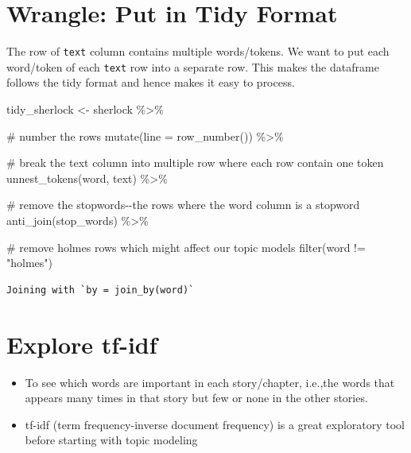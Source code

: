 \documentclass[
  letterpaper,
  DIV=11,
  numbers=noendperiod]{scrreprt}
\newenvironment{Shaded}{\begin{snugshade}}{\end{snugshade}}
\newcommand{\AttributeTok}[1]{\textcolor[rgb]{0.40,0.45,0.13}{#1}}
\newcommand{\CommentTok}[1]{\textcolor[rgb]{0.37,0.37,0.37}{#1}}
\newcommand{\FunctionTok}[1]{\textcolor[rgb]{0.28,0.35,0.67}{#1}}
\newcommand{\NormalTok}[1]{\textcolor[rgb]{0.00,0.23,0.31}{#1}}
\newcommand{\OtherTok}[1]{\textcolor[rgb]{0.00,0.23,0.31}{#1}}
\newcommand{\SpecialCharTok}[1]{\textcolor[rgb]{0.37,0.37,0.37}{#1}}
\newcommand{\StringTok}[1]{\textcolor[rgb]{0.13,0.47,0.30}{#1}}
\providecommand{\tightlist}{%
  \setlength{\itemsep}{0pt}\setlength{\parskip}{0pt}}\usepackage{longtable,booktabs,array}
\begin{document}
\chapter{Wrangle: Put in Tidy Format}\label{wrangle-put-in-tidy-format}

The row of \texttt{text} column contains multiple words/tokens. We want
to put each word/token of each \texttt{text} row into a separate row.
This makes the dataframe follows the tidy format and hence makes it easy
to process.

\begin{Shaded}
\begin{Highlighting}[]
\NormalTok{tidy\_sherlock }\OtherTok{\textless{}{-}}\NormalTok{ sherlock }\SpecialCharTok{\%\textgreater{}\%}
  
  \CommentTok{\# number the rows}
  \FunctionTok{mutate}\NormalTok{(}\AttributeTok{line =} \FunctionTok{row\_number}\NormalTok{()) }\SpecialCharTok{\%\textgreater{}\%} 
  
  \CommentTok{\# break the text column into multiple row where each row contain one token}
  \FunctionTok{unnest\_tokens}\NormalTok{(word, text) }\SpecialCharTok{\%\textgreater{}\%} 
  
  \CommentTok{\# remove the stopwords{-}{-}the rows where the word column is a stopword}
  \FunctionTok{anti\_join}\NormalTok{(stop\_words) }\SpecialCharTok{\%\textgreater{}\%} 
  
  \CommentTok{\# remove holmes rows which might affect our topic models}
  \FunctionTok{filter}\NormalTok{(word }\SpecialCharTok{!=} \StringTok{"holmes"}\NormalTok{)}
\end{Highlighting}
\end{Shaded}

\begin{verbatim}
Joining with `by = join_by(word)`
\end{verbatim}

\chapter{Explore tf-idf}\label{explore-tf-idf}

\begin{itemize}
\tightlist
\item
  To see which words are important in each story/chapter, i.e.,the words
  that appears many times in that story but few or none in the other
  stories.
\item
  tf-idf (term frequency-inverse document frequency) is a great
  exploratory tool before starting with topic modeling
\end{itemize}
\end{document}
